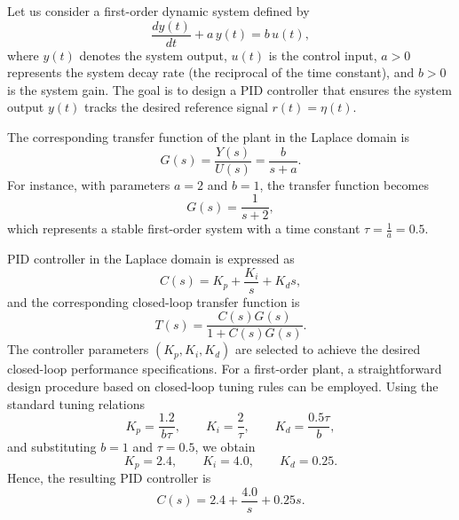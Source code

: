 \documentclass[preprint,12pt]{elsarticle}
\begin{document}
Let us consider a first-order dynamic system defined by
\begin{equation}\label{linear:control}
\frac{dy(t)}{dt} + a\,y(t) = b\,u(t),
\end{equation}
where \(y(t)\) denotes the system output, \(u(t)\) is the control input, \(a > 0\) represents the system decay rate (the reciprocal of the time constant), and \(b > 0\) is the system gain. The goal is to design a PID controller that ensures the system output \(y(t)\) tracks the desired reference signal \(r(t) = \eta(t)\). 

The corresponding transfer function of the plant in the Laplace domain is
\[
G(s) = \frac{Y(s)}{U(s)} = \frac{b}{s + a}.
\]
For instance, with parameters \(a = 2\) and \(b = 1\), the transfer function becomes
\[
G(s) = \frac{1}{s + 2},
\]
which represents a stable first-order system with a time constant 
\(\tau = \frac{1}{a} = 0.5\).

PID controller in the Laplace domain is expressed as
\[
C(s) = K_p + \frac{K_i}{s} + K_d s,
\]
and the corresponding closed-loop transfer function is
\[
T(s) = \frac{C(s)G(s)}{1 + C(s)G(s)}.
\]
The controller parameters \((K_p, K_i, K_d)\) are selected to achieve the desired closed-loop performance specifications. For a first-order plant, a straightforward design procedure based on closed-loop tuning rules \cite{Astrom1995PID} can be employed. Using the standard tuning relations
\[
K_p = \frac{1.2}{b\tau}, \qquad K_i = \frac{2}{\tau}, \qquad K_d = \frac{0.5\tau}{b},
\]
and substituting \(b = 1\) and \(\tau = 0.5\), we obtain
\[
K_p = 2.4, \qquad K_i = 4.0, \qquad K_d = 0.25.
\]
Hence, the resulting PID controller is
\[
C(s) = 2.4 + \frac{4.0}{s} + 0.25s.
\]
\end{document}
